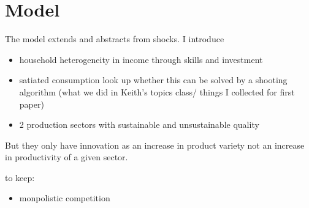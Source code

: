 \section{Model}

The model extends \cite{Bilbiie2012EndogenousCycles} and abstracts from shocks. 
I introduce
\begin{itemize}
\item household heterogeneity in income through skills and investment
\item satiated consumption \ar look up whether this can be solved by a shooting algorithm (what we did in Keith's topics class/ things I collected for first paper)
\item 2 production sectors with sustainable and unsustainable quality
\end{itemize}

But they only have innovation as an increase in product variety not an increase in productivity of a given sector.

to keep:
\begin{itemize}
\item monpolistic competition
\end{itemize}

